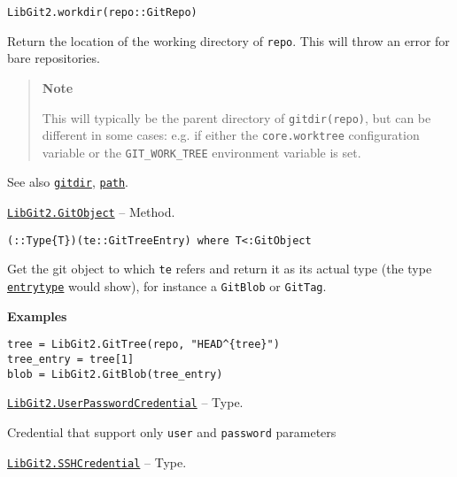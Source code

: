 \begin{adjustwidth}{2em}{0pt}


\begin{verbatim}
LibGit2.workdir(repo::GitRepo)
\end{verbatim}

Return the location of the working directory of \texttt{repo}. This will throw an error for bare repositories.

\begin{quote}
\textbf{Note}

This will typically be the parent directory of \texttt{gitdir(repo)}, but can be different in some cases: e.g. if either the \texttt{core.worktree} configuration variable or the \texttt{GIT\_WORK\_TREE} environment variable is set.

\end{quote}
See also \hyperlink{12125979754140967861}{\texttt{gitdir}}, \hyperlink{7655803558162329563}{\texttt{path}}.



\end{adjustwidth}
\hypertarget{12199863114467893789}{} 
\hyperlink{12199863114467893789}{\texttt{LibGit2.GitObject}}  -- {Method.}

\begin{adjustwidth}{2em}{0pt}


\begin{verbatim}
(::Type{T})(te::GitTreeEntry) where T<:GitObject
\end{verbatim}

Get the git object to which \texttt{te} refers and return it as its actual type (the type \hyperlink{5430515144387502914}{\texttt{entrytype}} would show), for instance a \texttt{GitBlob} or \texttt{GitTag}.

\textbf{Examples}


\begin{verbatim}
tree = LibGit2.GitTree(repo, "HEAD^{tree}")
tree_entry = tree[1]
blob = LibGit2.GitBlob(tree_entry)
\end{verbatim}



\end{adjustwidth}
\hypertarget{14233399752683117201}{} 
\hyperlink{14233399752683117201}{\texttt{LibGit2.UserPasswordCredential}}  -- {Type.}

\begin{adjustwidth}{2em}{0pt}

Credential that support only \texttt{user} and \texttt{password} parameters



\end{adjustwidth}
\hypertarget{10065416427289604487}{} 
\hyperlink{10065416427289604487}{\texttt{LibGit2.SSHCredential}}  -- {Type.}


